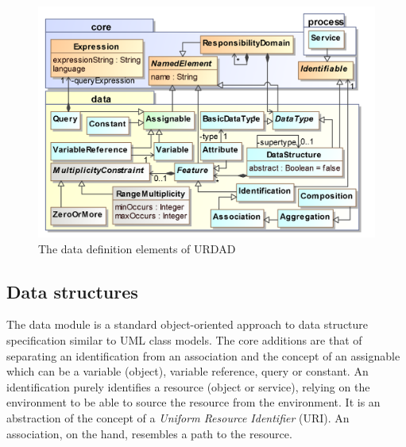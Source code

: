 
\begin{figure}[Htbp]
  \centering
  \includegraphics{data}
  \caption{The data definition elements of URDAD}
  \label{fig:metamodel}
\end{figure}

\subsection{Data structures}

The data module is a standard object-oriented approach to data structure specification similar to UML class models. The core additions are that of separating an identification from an association and the concept of an assignable which can be a variable (object), variable reference, query or constant. An identification purely identifies a resource (object or service), relying on the environment to be able to source the resource from the environment. It is an abstraction of the concept of a \emph{Uniform Resource Identifier} (URI). An association, on the hand, resembles a path to the resource.

